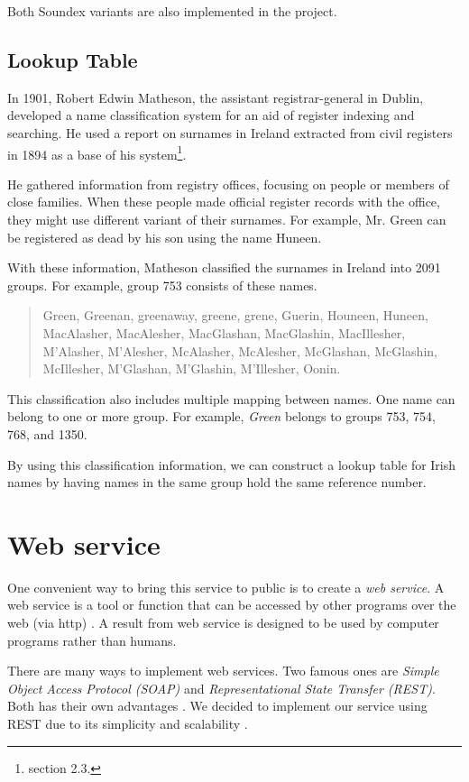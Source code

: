 Both Soundex variants are also implemented in the project.

\subsection{Lookup Table}

In 1901, Robert Edwin Matheson, the assistant registrar-general in Dublin,
developed a name classification system \cite{MathesonV} for an aid of register indexing
and searching. He used a report on surnames in Ireland extracted from
civil registers \cite{MathesonSR} in 1894 as a base
of his system\footnote{\cite{adamw} section 2.3.}.

He gathered information from registry offices, focusing on
people or members of close families. When these people made official
register records with the office, they might use different variant
of their surnames. For example, Mr. Green can be registered as dead
by his son using the name Huneen.

With these information, Matheson classified the surnames in Ireland
into 2091 groups. For example, group 753 consists of these names.

\begin{quotation} \noindent
Green, Greenan, greenaway, greene, grene, Guerin, Houneen, Huneen,
MacAlasher, MacAlesher, MacGlashan, MacGlashin, MacIllesher, M'Alasher,
M'Alesher, McAlasher, McAlesher, McGlashan, McGlashin, McIllesher,
M'Glashan, M'Glashin, M'Illesher, Oonin.
\end{quotation}

This classification also includes multiple mapping between names.
One name can belong to one or more group. For example, \emph{Green}
belongs to groups 753, 754, 768, and 1350.

By using this classification information, we can construct a lookup table
for Irish names by having names in the same group hold the same
reference number.

\section{Web service}

One convenient way to bring this service to public is to create a \emph{web service}.
A web service is a tool or function that can be accessed by other programs
over the web (via http) \cite{ws1}. A result from web service is designed
to be used by computer programs rather than humans.

There are many ways to implement web services. Two famous ones are
\emph{Simple Object Access Protocol (SOAP)} and
\emph{Representational State Transfer (REST)}.
Both has their own advantages \cite{ws2}. We decided to implement
our service using REST due to its simplicity and scalability \cite{ws3}\cite{ws4}.

